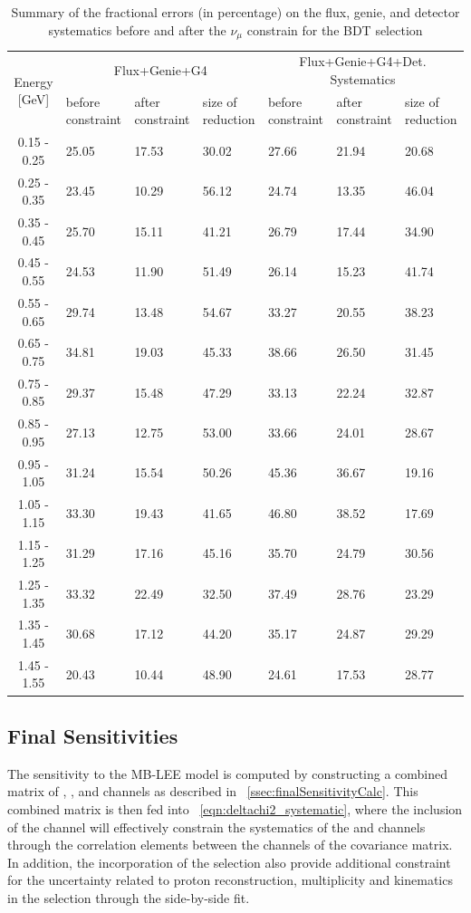 \begin{table}[H]
\centering
\begin{tabular}{| c | m{1.65cm} | m{1.65cm} | m{1.65cm} | m{1.65cm} | m{1.65cm} | m{1.65cm}|}
\cline{1-7}
\multirow{2}{*}{Energy [GeV]} &\multicolumn{3}{c|}{Flux+Genie+G4}&\multicolumn{3}{c|}{Flux+Genie+G4+Det. Systematics}\\
\cline{2-7}
{} &  before constraint & after constraint  & size of reduction & before constraint & after constraint & size of reduction \\
\hline
0.15 - 0.25 & 25.05 & 17.53 & 30.02 & 27.66 & 21.94 & 20.68 \\
0.25 - 0.35 & 23.45 & 10.29 & 56.12 & 24.74 & 13.35 & 46.04 \\
0.35 - 0.45 & 25.70 & 15.11 & 41.21 & 26.79 & 17.44 & 34.90 \\
0.45 - 0.55 & 24.53 & 11.90 & 51.49 & 26.14 & 15.23 & 41.74 \\
0.55 - 0.65 & 29.74 & 13.48 & 54.67 & 33.27 & 20.55 & 38.23 \\
0.65 - 0.75 & 34.81 & 19.03 & 45.33 & 38.66 & 26.50 & 31.45 \\
0.75 - 0.85 & 29.37 & 15.48 & 47.29 & 33.13 & 22.24 & 32.87 \\
0.85 - 0.95 & 27.13 & 12.75 & 53.00 & 33.66 & 24.01 & 28.67 \\
0.95 - 1.05 & 31.24 & 15.54 & 50.26 & 45.36 & 36.67 & 19.16 \\
1.05 - 1.15 & 33.30 & 19.43 & 41.65 & 46.80 & 38.52 & 17.69 \\
1.15 - 1.25 & 31.29 & 17.16 & 45.16 & 35.70 & 24.79 & 30.56 \\
1.25 - 1.35 & 33.32 & 22.49 & 32.50 & 37.49 & 28.76 & 23.29 \\
1.35 - 1.45 & 30.68 & 17.12 & 44.20 & 35.17 & 24.87 & 29.29 \\
1.45 - 1.55 & 20.43 & 10.44 & 48.90 & 24.61 & 17.53 & 28.77 \\
\hline
\end{tabular}
\caption{Summary of the fractional errors (in percentage) on the flux, genie, and detector systematics before and after the $\nu_\mu$ constrain for the \zpsel BDT selection}
\label{tab:numu_1e0p_bdt_const}
\end{table}

\subsection{Final Sensitivities}

\par The sensitivity to the MB-\nue LEE model is computed by constructing a combined matrix of \npsel, \zpsel, and \numu channels as described in ~\cref{ssec:finalSensitivityCalc}. This combined matrix is then fed into ~\cref{eqn:deltachi2_systematic}, where the inclusion of the \numu channel will effectively constrain the systematics of the \npsel and \zpsel channels through the correlation elements between the channels of the covariance matrix. In addition, the incorporation of the \zpsel selection also provide additional constraint for the uncertainty related to proton reconstruction, multiplicity and kinematics in the \npsel selection through the side-by-side fit.

